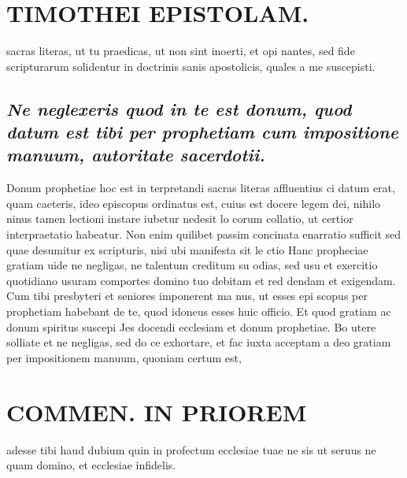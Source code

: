 \documentclass{article}
\begin{document}
\begin{pages}
\section*{TIMOTHEI EPISTOLAM. }
\marginpar{[ p.111 ]}\pstart sacras literas, ut tu praedicas, ut non sint inoerti, et opi nantes, sed fide scripturarum solidentur in doctrinis sanis apostolicis, quales a me suscepisti.  \pend
{}
{}
\subsection*{\textit{Ne neglexeris quod in te est donum, quod datum est tibi per prophetiam cum impositione manuum, autoritate sacerdotii. }}\pstart Donum prophetiae hoc est in terpretandi sacras literas affluentius ci datum erat, quam caeteris, ideo episcopus ordinatus est, cuius est docere legem dei, nihilo ninus tamen lectioni instare iubetur nedesit lo corum collatio, ut certior interpraetatio habeatur. Non enim quilibet passim concinata enarratio sufficit sed quae desumitur ex scripturis, nisi ubi manifesta sit le ctio Hanc propheciae gratiam uide ne negligas, ne talentum creditum su odias, sed usu et exercitio quotidiano usuram comportes domino tuo debitam et red dendam et exigendam.  \pend\pstart Cum tibi presbyteri et seniores imponerent ma nus, ut esses epi scopus per prophetiam habebant de te, quod idoneus esses huic officio. Et quod gratiam ac donum spiritus suscepi Jes docendi ecclesiam et donum prophetiae. Bo utere solliate et ne negligas, sed do ce exhortare, et fac iuxta acceptam a deo gratiam per impositionem manuum, quoniam certum est,  \pend
\section*{COMMEN. IN PRIOREM }
\marginpar{[ p.112 ]}\pstart adesse tibi haud dubium quin in profectum ecclesiae tuae ne sis ut seruus ne quam domino, et ecclesiae infidelis.  \pend
{}
{}

\end{pages}
\end{document}
